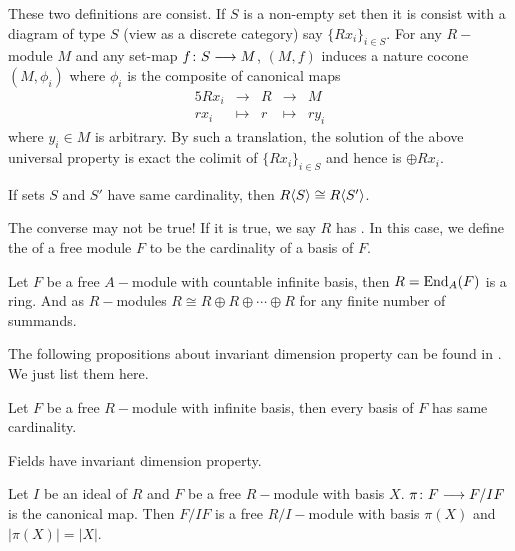   These two definitions are consist. If $S$ is a non-empty set then it is consist with a diagram of type $S$ (view as a discrete category) say $\{Rx_i\}_{i\in S}$. For any $R-$module $M$ and any set-map $f\colon S\longrightarrow M$, $(M,f)$ induces a nature cocone $(M,\phi_i)$ where $\phi_i$ is the composite of canonical maps
  \begin{alignat*}{5}
       Rx_i & \longrightarrow & R & \longrightarrow & M \\
       rx_i & \longmapsto & r & \longmapsto & ry_i
  \end{alignat*}
  where $y_i\in M$ is arbitrary. By such a translation, the solution of the above universal property is exact the colimit of $\{Rx_i\}_{i\in S}$ and hence is $\oplus Rx_i$.

  \begin{prop}
    If sets $S$ and $S'$ have same cardinality, then $R\langle S\rangle\cong R\langle S'\rangle$.
  \end{prop}

  \begin{warn}
     The converse may not be true! If it is true, we say $R$ has . In this case, we define the  of a free module $F$ to be the cardinality of a basis of $F$.
  \end{warn}

  \begin{exam}
    Let $F$ be a free $A-$module with countable infinite basis, then $R=\operatorname{End}_A(F)$ is a ring. And as $R-$modules $R\cong R\oplus R\oplus \cdots \oplus R$ for any finite number of summands.
  \end{exam}

  The following propositions about invariant dimension property can be found in \cite{hungerford1974algebra}. We just list them here.

  \begin{prop}
    Let $F$ be a free $R-$module with infinite basis, then every basis of $F$ has same cardinality.
  \end{prop}

  \begin{prop}\label{3.5.2}
    Fields have invariant dimension property.
  \end{prop}

  \begin{prop}
    Let $I$ be an ideal of $R$ and $F$ be a free $R-$module with basis $X$. $\pi\colon F\longrightarrow F/IF$ is the canonical map. Then $F/IF$ is a free $R/I-$module with basis $\pi(X)$ and $|\pi(X)|=|X|$.
  \end{prop}

